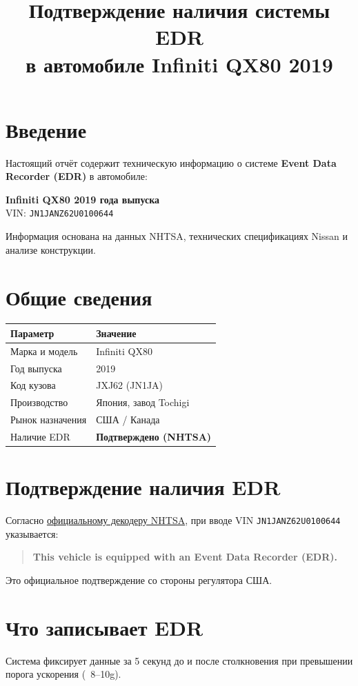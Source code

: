 \documentclass[12pt]{article}
\title{\bfseries\Large Подтверждение наличия системы EDR \\ в автомобиле Infiniti QX80 2019}
\date{}
\begin{document}
\maketitle
\thispagestyle{fancy}

\section*{Введение}
Настоящий отчёт содержит техническую информацию о системе \textbf{Event Data Recorder (EDR)} в автомобиле:
\begin{center}
\textbf{Infiniti QX80 2019 года выпуска} \\
VIN: \texttt{JN1JANZ62U0100644}
\end{center}
Информация основана на данных NHTSA, технических спецификациях Nissan и анализе конструкции.

\section{Общие сведения}
\begin{tabularx}{\textwidth}{lX}
    \toprule
    \textbf{Параметр} & \textbf{Значение} \\
    \midrule
    Марка и модель & Infiniti QX80 \\
    Год выпуска & 2019 \\
    Код кузова & JXJ62 (JN1JA) \\
    Производство & Япония, завод Tochigi \\
    Рынок назначения & США / Канада \\
    Наличие EDR & \textbf{Подтверждено (NHTSA)} \\
    \bottomrule
\end{tabularx}

\section{Подтверждение наличия EDR}
Согласно \href{https://www.nhtsa.gov/vin-decoder}{официальному декодеру NHTSA}, при вводе VIN \texttt{JN1JANZ62U0100644} указывается:

\begin{quote}
    \textbf{This vehicle is equipped with an Event Data Recorder (EDR).}
\end{quote}

Это официальное подтверждение со стороны регулятора США.

\section{Что записывает EDR}
Система фиксирует данные за 5 секунд до и после столкновения при превышении порога ускорения (~8–10g).
\end{document}
